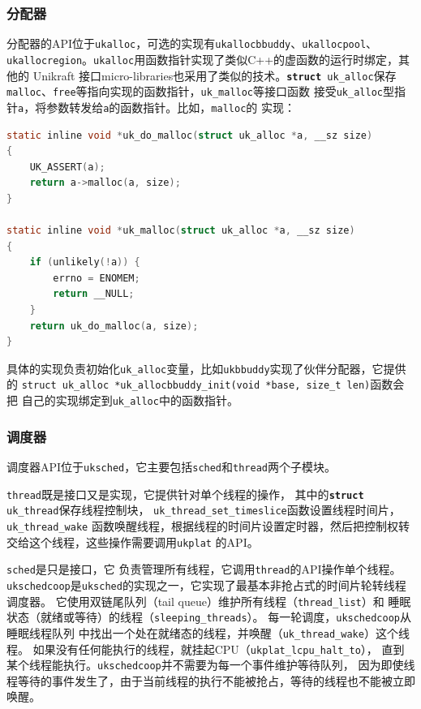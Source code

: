 \documentclass{../runikraft-report}
\begin{document}
\subsubsection{分配器}
分配器的API位于\texttt{ukalloc}，可选的实现有\texttt{ukallocbbuddy}、\texttt{ukallocpool}、
\texttt{ukallocregion}。\texttt{ukalloc}用函数指针实现了类似C++的虚函数的运行时绑定，其他的
Unikraft 接口micro-libraries也采用了类似的技术。\texttt{\textbf{struct} uk\_alloc}保存
\texttt{malloc}、\texttt{free}等指向实现的函数指针，\texttt{uk\_malloc}等接口函数
接受\texttt{uk\_alloc}型指针\texttt{a}，将参数转发给\texttt{a}的函数指针。比如，\texttt{malloc}的
实现：
\begin{lstlisting}[language=C]
static inline void *uk_do_malloc(struct uk_alloc *a, __sz size)
{
	UK_ASSERT(a);
	return a->malloc(a, size);
}

static inline void *uk_malloc(struct uk_alloc *a, __sz size)
{
	if (unlikely(!a)) {
		errno = ENOMEM;
		return __NULL;
	}
	return uk_do_malloc(a, size);
}
\end{lstlisting}

具体的实现负责初始化\texttt{uk\_alloc}变量，比如\texttt{ukbbuddy}实现了伙伴分配器，它提供的
\texttt{struct uk\_alloc *uk\_allocbbuddy\_init(void *base, size\_t len)}函数会把
自己的实现绑定到\texttt{uk\_alloc}中的函数指针。

\subsubsection{调度器}
调度器API位于\texttt{uksched}，它主要包括\texttt{sched}和\texttt{thread}两个子模块。

\texttt{thread}既是接口又是实现，它提供针对单个线程的操作，
其中的\texttt{\textbf{struct} uk\_thread}保存线程控制块，
\texttt{uk\_thread\_set\_timeslice}函数设置线程时间片，\texttt{uk\_thread\_wake}
函数唤醒线程，根据线程的时间片设置定时器，然后把控制权转交给这个线程，这些操作需要调用\texttt{ukplat}
的API。

\texttt{sched}是只是接口，它
负责管理所有线程，它调用\texttt{thread}的API操作单个线程。
\texttt{ukschedcoop}是\texttt{uksched}的实现之一，它实现了最基本非抢占式的时间片轮转线程调度器。
它使用双链尾队列（tail queue）维护所有线程（\texttt{thread\_list}）和
睡眠状态（就绪或等待）的线程（\texttt{sleeping\_threads}）。
每一轮调度，\texttt{ukschedcoop}从睡眠线程队列
中找出一个处在就绪态的线程，并唤醒（\texttt{uk\_thread\_wake}）这个线程。
如果没有任何能执行的线程，就挂起CPU（\texttt{ukplat\_lcpu\_halt\_to}），
直到某个线程能执行。\texttt{ukschedcoop}并不需要为每一个事件维护等待队列，
因为即使线程等待的事件发生了，由于当前线程的执行不能被抢占，等待的线程也不能被立即唤醒。
\end{document}
